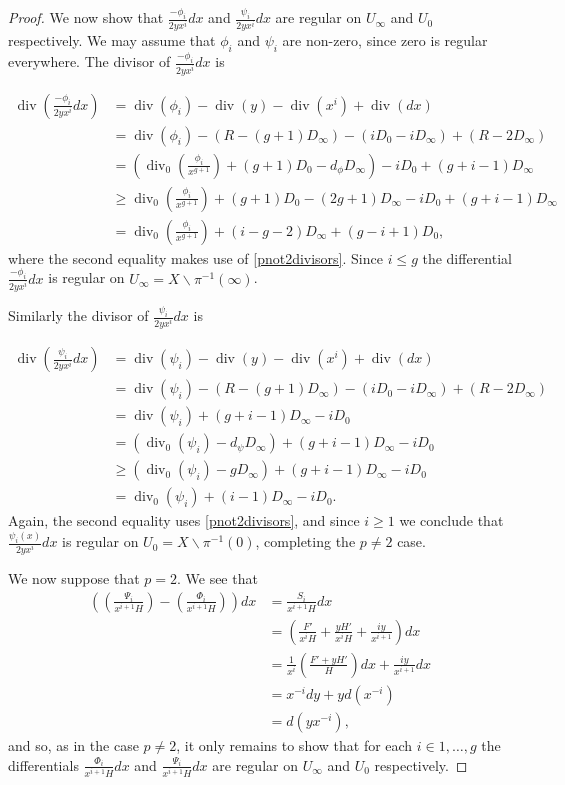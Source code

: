 \documentclass[draft, 11pt]{article} %
\theoremstyle{plain}
\theoremstyle{remark}
\DeclareMathOperator{\di}{div}
\begin{document}
\begin{proof}
We now show that $\frac{-\phi_i}{2yx^i}dx$ and $\frac{\psi_i}{2yx^i}dx$ are regular on $U_\infty$ and $U_0$ respectively.
We may assume that $\phi_i$ and $\psi_i$ are non-zero, since zero is regular everywhere.
The divisor of $\frac{-\phi_i}{2yx^i}dx$ is

\begin{align*}
\di\left( \frac{-\phi_i}{2yx^i}dx \right) & =  \di(\phi_i) -\di(y) - \di(x^i) + \di (dx) \\
& =  \di(\phi_i) - ( R - (g+1)D_\infty) - (iD_0 - iD_\infty) + (R - 2D_\infty) \\
& =  \left( \di_0\left( \frac{\phi_i}{x^{g+1}}\right) + (g+1)D_0 - d_\phi D_\infty\right) - iD_0 + (g+i-1)D_\infty \\
& \geq  \di_0\left( \frac{\phi_i}{x^{g+1}}\right) + (g+1)D_0 - (2g+1)D_\infty - iD_0 + (g+i-1)D_\infty \\
& =  \di_0\left( \frac{\phi_i}{x^{g+1}} \right) + (i-g-2)D_\infty + (g-i+1)D_0,
\end{align*}
where the second equality makes use of \eqref{pnot2divisors}.
Since $i \leq g$ the differential $\frac{-\phi_i}{2yx^i}dx$ is regular on $U_\infty = X\backslash \pi^{-1}(\infty)$.

Similarly the divisor of $\frac{\psi_i}{2yx^i}dx$ is

\begin{align*}
\di \left( \frac{\psi_i}{2yx^i}dx\right) & =  \di(\psi_i) - \di(y) - \di(x^i) + \di (dx) \\
& =  \di (\psi_i ) -(R - (g+1)D_\infty) - (iD_0 - iD_\infty) + (R -2D_\infty) \\
& =  \di(\psi_i) + (g+i-1)D_\infty -iD_0 \\
& =  (\di_0(\psi_i) -d_\psi D_\infty) + (g+i-1)D_\infty -iD_0 \\
& \geq \left( \di_0(\psi_i) - gD_\infty \right) + (g+i-1)D_\infty -iD_0 \\
& =  \di_0(\psi_i) + (i-1)D_\infty - iD_0.
\end{align*}
Again, the second equality uses \eqref{pnot2divisors}, and since $i\geq 1$ we conclude that $\frac{\psi_i(x)}{2yx^i}dx$ is regular on $U_0 = X \backslash \pi^{-1}(0)$, completing the $p\neq 2$ case.


We now suppose that $p=2$.
We see that
\begin{align*}
\left( \left( \frac{ \Psi_i}{x^{i+1}H} \right) - \left( \frac{\Phi_i}{x^{i+1}H} \right) \right) dx & =  \frac{S_i}{x^{i+1}H}dx \\
& =  \left( \frac{F'}{x^iH} + \frac{yH'}{x^iH} + \frac{iy}{x^{i+1}} \right) dx \\
& =  \frac{1}{x^i}\left( \frac{F' + yH'}{H} \right) dx + \frac{iy}{x^{i+1}}dx \\
& =  x^{-i}dy + yd \left( x^{-i}\right) \\
& =  d\left( yx^{-i}\right),
\end{align*}
and so, as in the case $p \neq 2$, it only remains to show that for each $i\in {1, \ldots, g}$ the differentials $\frac{\Phi_i}{x^{i+1}H}dx$ and $\frac{\Psi_i}{x^{i+1}H}dx$ are regular on $U_\infty$ and $U_0$ respectively.



\end{proof}
\end{document}
